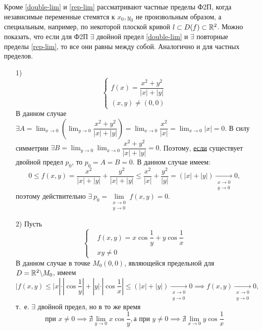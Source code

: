 \documentclass[../../main.tex]{subfiles}
\begin{document}
Кроме \eqref{double-lim} и \eqref{rep-lim} рассматривают частные
пределы Ф2П, когда независимые переменные стемятся к $x_0, y_0$
не произвольным образом, а специальным, например, по некоторой плоской
кривой $l \subset{D(f)} \subset \mathbb{R}^2$. Можно показать, что если для Ф2П
$\exists$ двойной предел \eqref{double-lim} и $\exists$ повторные
пределы \eqref{rep-lim}, то все они равны между собой. Аналогично и
для частных пределов.

\begin{exmps}
\begin{itemize}
	\item[1)] 
	\[\left\{\begin{aligned}
		f(x) = \dfrac{x^2 + y^2}{|x| + |y|} \\
		(x, y) \ne (0, 0)
	\end{aligned}\right.\]
	В данном случае $\exists A = \displaystyle\lim_{x \to 0}
	{\left(\lim_{y \to 0}{ \dfrac{x^2 + y^2}{|x| + |y|} }\right)} =
	\displaystyle \lim_{x \to 0}{\dfrac{x^2}{|x|}} =
	\displaystyle \lim_{x \to 0}{|x|} = 0$. В силу симметрии
	$\exists B = \displaystyle\lim_{y \to 0}
	{\lim_{x \to 0}{ \dfrac{x^2 + y^2}{|x| + |y|} }} = 0$.
	Поэтому, \underline{если} существует двойной предел $p_0$,
	то $p_0=A=B=0$. В данном случае имеем:
	\[
		0 \leq f(x, y) = 
		\dfrac{x^2}{|x| + |y|} + \dfrac{y^2}{|x| + |y|} \leq
		\dfrac{x^2}{|x|} + \dfrac{y^2}{|y|} = (|x| + |y|) 
		\underset{\substack{x \to 0 \\ y \to 0}}{\longrightarrow}0,
	\]
	поэтому действительно $\exists\ p_0 = \underset{\substack{x \to 0 \\ y \to 0}}
	{\lim}f(x, y) = 0$.
	
	\item[2)] Пусть \[\left\{\begin{aligned}
		&f(x, y) = x \cos{\dfrac{1}{y}} + y \cos{\dfrac{1}{x}} \\
		&xy \ne 0
	\end{aligned}\right.\]
	В данном случае в точке $M_0(0, 0)$, являющейся предельной для
	$D = \mathbb{R}^2 \backslash M_0$, имеем
	\[|f(x, y) \leq |x| \cdot \left|\cos{\dfrac{1}{y}} \right| + |y| \cdot 
	\left|\cos{\dfrac{1}{x}} \right| \leq (|x| + |y|) 
	\underset{\substack{x \to 0 \\ y \to 0}}{\longrightarrow}0 \implies
	f(x, y) \underset{\substack{x \to 0 \\ y \to 0}}{\longrightarrow}0,\] т.~е. 
	$\exists$ двойной предел, но в то же время 
	\[\text{при } x \ne 0 \implies \nexists \displaystyle \lim_{y \to 0}
	x \cos{\dfrac{1}{y}}, \text{а при } y \ne 0 \implies
	\nexists \displaystyle \lim_{x \to 0} y \cos{\dfrac{1}{x}}\] 
	

\end{itemize}
\end{exmps}
\end{document}

